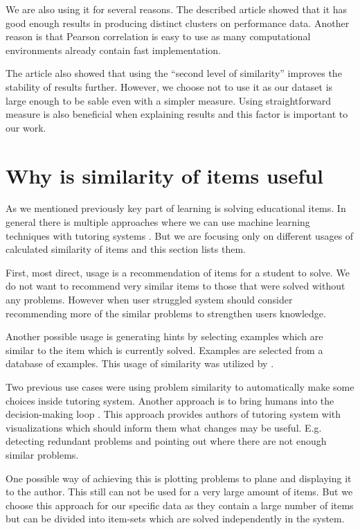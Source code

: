 \documentclass[
  digital, %
  table,   %
  nolof,     %
  nolot,     %
  nocover,
  color,
  final, %
]{fithesis3}
\begin{document}
We are also using it for several reasons. The described article showed that it has good enough results in producing distinct clusters on performance data. Another reason is that Pearson correlation is easy to use as many computational environments already contain fast implementation.

The article also showed that using the ``second level of similarity'' improves the stability of results further. However, we choose not to use it as our dataset is large enough to be sable even with a simpler measure. Using straightforward measure is also beneficial when explaining results and this factor is important to our work.


\section{Why is similarity of items useful}\label{why-is-similarity-of-items-useful}


As we mentioned previously key part of learning is solving educational items. In general there is multiple approaches where we can use machine learning techniques with tutoring systems \cite{baker2010data}. But we are focusing only on different usages of calculated similarity of items and this section lists them.

First, most direct, usage is a recommendation of items for a student to solve. We do not want to recommend very similar items to those that were solved without any problems. However when user struggled system should consider recommending more of the similar problems to strengthen users knowledge.

Another possible usage is generating hints by selecting examples which are similar to the item which is currently solved. Examples are selected from a database of examples. This usage of similarity was utilized by \citeauthor{hosseini2017study}\cite{hosseini2017study}.

Two previous use cases were using problem similarity to automatically make some choices inside tutoring system. Another approach is to bring humans into the decision-making loop \cite{baker2016stupid}. This approach provides authors of tutoring system with visualizations which should inform them what changes may be useful. E.g. detecting redundant problems and pointing out where there are not enough similar problems.

One possible way of achieving this is plotting problems to plane and displaying it to the author. This still can not be used for a very large amount of items. But we choose this approach for our specific data as they contain a large number of items but can be divided into item-sets which are solved independently in the system.
\end{document}
